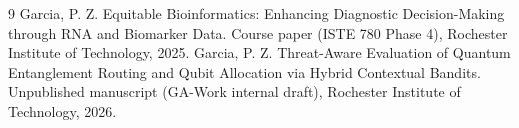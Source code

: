 \documentclass{IEEEtran}
\begin{document}
\begin{thebibliography}{9}\setlength{\itemsep}{0em}
Garcia, P. Z. Equitable Bioinformatics: Enhancing Diagnostic Decision-Making through {RNA}
and Biomarker Data. Course paper (ISTE 780 Phase 4), Rochester Institute of Technology,
2025.
Garcia, P. Z. Threat-Aware Evaluation of Quantum Entanglement Routing and Qubit Allocation
via Hybrid Contextual Bandits. Unpublished manuscript (GA-Work internal draft), Rochester
Institute of Technology, 2026.
\end{thebibliography}
\end{document}
